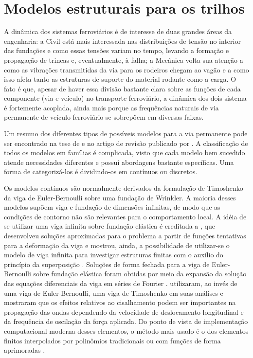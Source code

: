 \section{Modelos estruturais para os trilhos}
A dinâmica dos sistemas ferroviários é de interesse de duas grandes áreas da engenharia: a Civil está mais interessada nas distribuições de tensão no interior das fundações e como essas tensões variam no tempo, levando a formação e propagação de trincas e, eventualmente, à falha; a Mecânica volta sua atenção a como as vibrações transmitidas da via para os rodeiros chegam ao vagão e a como isso afeta tanto as estruturas de suporte do material rodante como a carga. O fato é que, apesar de haver essa divisão bastante clara sobre as funções de cada componente (via e veículo) no transporte ferroviário, a dinâmica dos dois sistema é fortemente acoplada, ainda mais porque as frequências naturais de via permanente de veículo ferroviário se sobrepõem em diversas faixas.

Um resumo dos diferentes tipos de possíveis modelos para a via permanente pode ser encontrado na tese de  e no artigo de revisão publicado por . A classificação de todos os modelos em famílias é complicada, visto que cada modelo bem sucedido atende necessidades diferentes e possui abordagens bastante específicas. Uma forma de categorizá-los é dividindo-os em contínuos ou discretos.

Os modelos contínuos são normalmente derivados da formulação de Timoshenko da viga de Euler-Bernoulli sobre uma fundação de Wrinkler. A maioria desses modelos supõem viga e fundação de dimensões infinitas, de modo que as condições de contorno não são relevantes para o comportamento local. A idéia de se utilizar uma viga infinita sobre fundação elástica é creditada a , que desenvolveu soluções aproximadas para o problema a partir de funções tentativas para a deformação da viga e mostrou, ainda, a possibilidade de utilizar-se o modelo de viga infinita para investigar estruturas finitas com o auxílio do princípio da superposição \cite{hetenyi_beams_1946}. Soluções de forma fechada para a viga de Euler-Bernoulli sobre fundação elástica foram obtidas por meio da expansão da solução das equações diferenciais da viga em séries de Fourier \cite{mathews_vibrations_1958}.  utilizaram, ao invés de uma viga de Euler-Bernoulli, uma viga de Timoshenko em suas análises e 
mostraram que os efeitos relativos ao cisalhamento podem ser importantes na propagação das ondas dependendo da velocidade de deslocamento longitudinal e da frequência de oscilação da força aplicada. Do ponto de vista de implementação computacional moderna desses elementos, o método mais usado é o dos elementos finitos interpolados por polinômios tradicionais \cite{soriano_metodo_2003,felippa_introduction_2004} ou com funções de forma aprimoradas \cite{limkatanyu_nonlinear_2013}.

